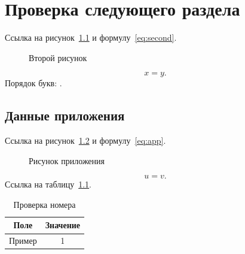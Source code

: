 \documentclass[14pt,a4paper,oneside]{extreport}
\begin{document}
\chapter{Проверка следующего раздела}
Ссылка на рисунок~\ref{fig:second} и формулу~\eqref{eq:second}.
\begin{figure}[!htbp]\centering{}
\caption{Второй рисунок}\label{fig:second}\end{figure}
\begin{equation}\label{eq:second}x=y.\end{equation}
Порядок букв:                          .
\section{Данные приложения}
Ссылка на рисунок~\ref{fig:app} и формулу~\eqref{eq:app}.
\begin{figure}[!htbp]\centering{}
\caption{Рисунок приложения}\label{fig:app}\end{figure}
\begin{equation}\label{eq:app}u=v.\end{equation}
Ссылка на таблицу~\ref{tab:app}.
\begin{table}[!htbp]\caption{Проверка номера}\label{tab:app}
\centering\begin{tabular}{|c|c|}\hline Поле & Значение\\\hline Пример & 1\\\hline\end{tabular}\end{table}
\end{document}

